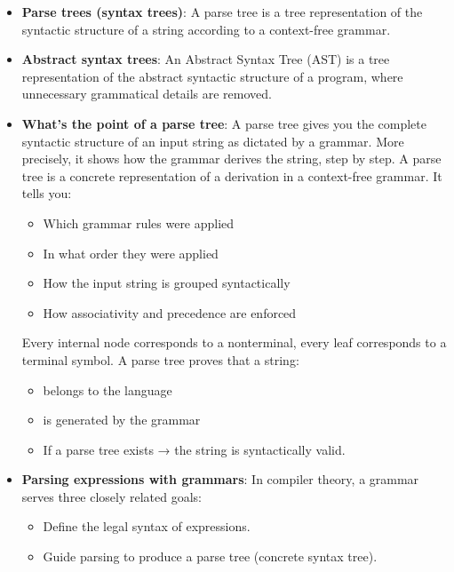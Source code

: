 \documentclass{report}
\begin{document}
        \pagebreak 
        \begin{itemize}
            \item \textbf{Parse trees (syntax trees)}: A parse tree is a tree representation of the syntactic structure of a string according to a context-free grammar.
            \item \textbf{Abstract syntax trees}: An Abstract Syntax Tree (AST) is a tree representation of the abstract syntactic structure of a program, where unnecessary grammatical details are removed.
            \item \textbf{What's the point of a parse tree}: A parse tree gives you the complete syntactic structure of an input string as dictated by a grammar. More precisely, it shows how the grammar derives the string, step by step.
            \bigbreak \noindent 
            A parse tree is a concrete representation of a derivation in a context-free grammar. It tells you:
            \begin{itemize}
                \item Which grammar rules were applied
                \item In what order they were applied
                \item How the input string is grouped syntactically
                \item How associativity and precedence are enforced
            \end{itemize}
            Every internal node corresponds to a nonterminal, every leaf corresponds to a terminal symbol.
            \bigbreak \noindent 
            A parse tree proves that a string:
            \begin{itemize}
                \item belongs to the language
                \item is generated by the grammar
                \item If a parse tree exists → the string is syntactically valid.
            \end{itemize}
        \item \textbf{Parsing expressions with grammars}: 
            In compiler theory, a grammar serves three closely related goals:
            \begin{itemize}
                \item Define the legal syntax of expressions.
                \item Guide parsing to produce a parse tree (concrete syntax tree).

\end{itemize}
\end{itemize}
\end{document}
